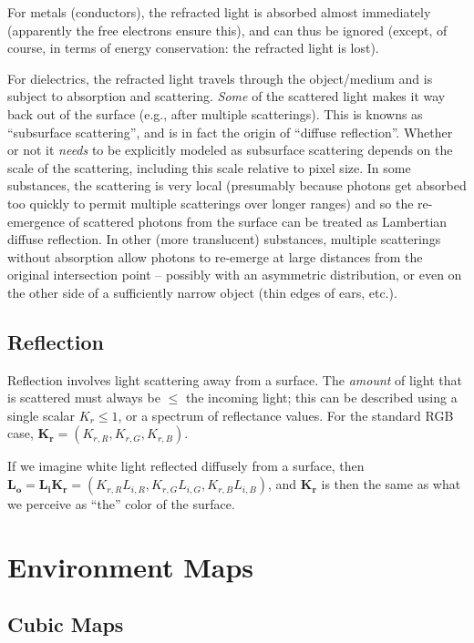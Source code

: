 \documentclass[11pt]{article}
\begin{document}
For metals (conductors), the refracted light is absorbed almost immediately (apparently the free
electrons ensure this), and can thus be ignored (except, of course, in terms of
energy conservation: the refracted light is lost).

For dielectrics, the refracted light travels through the object/medium
and is subject to absorption and scattering. \textit{Some} of the
scattered light makes it way back out of the surface (e.g., after
multiple scatterings). This is knowns as ``subsurface scattering'', and
is in fact the origin of ``diffuse reflection''. Whether or not it
\textit{needs} to be explicitly modeled as subsurface scattering depends
on the scale of the scattering, including this scale relative to pixel
size. In some substances, the scattering is very local (presumably
because photons get absorbed too quickly to permit multiple scatterings
over longer ranges) and so the re-emergence of scattered photons from
the surface can be treated as Lambertian diffuse reflection. In other
(more translucent) substances, multiple scatterings without absorption
allow photons to re-emerge at large distances from the original
intersection point -- possibly with an asymmetric distribution, or even
on the other side of a sufficiently narrow object (thin edges of ears,
etc.).



\subsection{Reflection}

Reflection involves light scattering away from a surface. The \textit{amount} of light
that is scattered must always be $\le$ the incoming light; this can be
described using a single scalar $K_{r} \le 1$, or a spectrum of reflectance values.
For the standard RGB case, $\mathbf{K_{r}} = (K_{r,R}, K_{r,G}, K_{r,B})$.

If we imagine white light reflected diffusely from a surface, then
$\mathbf{L_{o}} = \mathbf{L_{i}} \mathbf{K_{r}} = (K_{r,R} L_{i,R},
K_{r,G} L_{i,G}, K_{r,B} L_{i,B})$, and $\mathbf{K_{r}}$ is then the
same as what we perceive as ``the'' color of the surface.


\section{Environment Maps}

\subsection{Cubic Maps}
\end{document}

